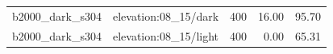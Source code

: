 \begin{longtable}{l>{\raggedright\arraybackslash}p{.42\linewidth}rrr}
b2000\_\allowbreak{}dark\_\allowbreak{}s304 & %
elevation:08\_\allowbreak{}15/dark & %
400 & %
16.00 & %
95.70 \\ %

b2000\_\allowbreak{}dark\_\allowbreak{}s304 & %
elevation:08\_\allowbreak{}15/light & %
400 & %
0.00 & %
65.31 \\ %


\end{longtable}
